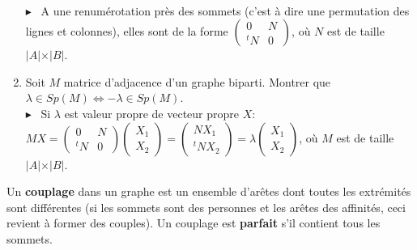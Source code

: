\documentclass[mp2i]{exam}
\begin{document}
\begin{enumerate}
		\if{}
		\\$\blacktriangleright$~ A une renumérotation près des sommets (c'est à dire une permutation des lignes et colonnes), elles sont de la forme $\begin{pmatrix}
		0 & N \\
		{}^tN & 0
		\end{pmatrix}$, où $N$ est de taille $\vert A \vert \times \vert B \vert$.
		\fi 
		\item Soit $M$ matrice d'adjacence d'un graphe biparti. Montrer que $\lambda \in Sp(M) \Longleftrightarrow -\lambda \in Sp(M)$.
		\if{}
		\\$\blacktriangleright$~ Si $\lambda$ est valeur propre de vecteur propre $X$:
		 $M X = \begin{pmatrix}
		0 & N \\
		{}^tN & 0
		\end{pmatrix} 
		\begin{pmatrix}
			X_1 \\
			X_2 
		\end{pmatrix} = \begin{pmatrix}
		N X_1 \\
		{}^tN X_2 
		\end{pmatrix} = \lambda \begin{pmatrix}
		X_1 \\
		X_2 
		\end{pmatrix}$, où $M$ est de taille $\vert A \vert \times \vert B \vert$.
		\fi 
	\end{enumerate}
	Un \textbf{couplage} dans un graphe est un ensemble d'arêtes dont toutes les extrémités sont différentes (si les sommets sont des personnes et les arêtes des affinités, ceci revient à former des couples). Un couplage est \textbf{parfait} s'il contient tous les sommets.
\end{document}
